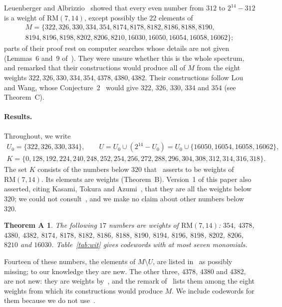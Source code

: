 \documentclass[11pt]{article}
\newtheorem*{thmA}{Theorem A}
\theoremstyle{remark}
\newcommand{\RM}{\mathrm{RM}}
\begin{document}
Leuenberger and Albrizzio~\cite[Proposition~4]{la} showed that every even
number from $312$ to $2^{14}-312$ is a weight of $\RM(7,14)$, except possibly
the $22$ elements of
\begin{multline*}
M=\{322,326,330,334,354,8174,8178,8182,8186,8188,8190,\\
8194,8196,8198,8202,8206,8210,16030,16050,16054,16058,16062\};
\end{multline*}
parts of their proof rest on computer searches whose details are not given
(Lemmas~6 and~9 of~\cite{la}). They were unsure whether this is the whole
spectrum, and remarked that their constructions would produce all of $M$ from
the eight weights $322,326,330,334,354,4378,4380,4382$. Their constructions
follow Lou and Wang, whose Conjecture~2~\cite{lw} would give $322$, $326$,
$330$, $334$ and $354$ (see Theorem~C).

\paragraph{Results.}
Throughout, we write
\begin{gather*}
U_0=\{322,326,330,334\},\qquad U=U_0\cup(2^{14}-U_0)=U_0\cup\{16050,16054,16058,16062\},\\
K=\{0,128,192,224,240,248,252,254,256,272,288,296,304,308,312,314,316,318\}.
\end{gather*}
The set $K$ consists of the numbers below $320$ that~\cite[Proposition~4]{la}
asserts to be weights of $\RM(7,14)$. Its elements are weights (Theorem~B).
Version~1 of this paper also asserted, citing Kasami, Tokura and
Azumi~\cite{kta}, that they are all the weights below $320$; we could not
consult~\cite{kta}, and we make no claim about other numbers below $320$.

\begin{thmA}
The following $17$ numbers are weights of $\RM(7,14)$: $354$, $4378$, $4380$,
$4382$, $8174$, $8178$, $8182$, $8186$, $8188$, $8190$, $8194$, $8196$,
$8198$, $8202$, $8206$, $8210$ and $16030$. Table~\ref{tab:wit} gives
codewords with at most seven monomials.
\end{thmA}

Fourteen of these numbers, the elements of $M\setminus U$, are listed
in~\cite{la} as possibly missing; to our knowledge they are new. The other three, $4378$,
$4380$ and $4382$, are not new: they are weights by~\cite[Proposition~4]{la},
and the remark of~\cite{la} lists them among the eight weights from which its
constructions would produce $M$. We include codewords for them because we do
not use~\cite[Proposition~4]{la}.
\end{document}
